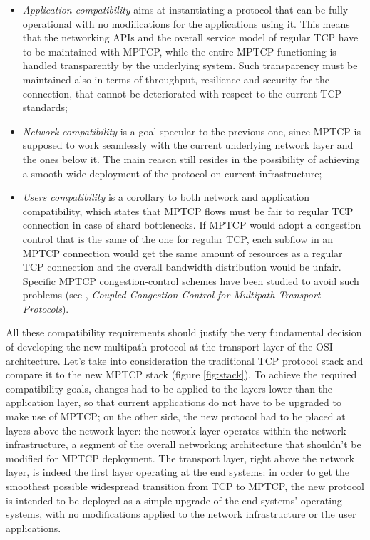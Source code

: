 \begin{itemize}
  \item \textit{Application compatibility} aims at instantiating a protocol that can be fully operational with no modifications for the applications using it. This means that the networking APIs and the overall service model of regular TCP have to be maintained with MPTCP, while the entire MPTCP functioning is handled transparently by the underlying system. Such transparency must be maintained also in terms of throughput, resilience and security for the connection, that cannot be deteriorated with respect to the current TCP standards;
  \item \textit{Network compatibility} is a goal specular to the previous one, since MPTCP is supposed to work seamlessly with the current underlying network layer and the ones below it. The main reason still resides in the possibility of achieving a smooth wide deployment of the protocol on current infrastructure;
  \item \textit{Users compatibility} is a corollary to both network and application compatibility, which states that MPTCP flows must be fair to regular TCP connection in case of shard bottlenecks. If MPTCP would adopt a congestion control that is the same of the one for regular TCP, each subflow in an MPTCP connection would get the same amount of resources as a regular TCP connection and the overall bandwidth distribution would be unfair. Specific MPTCP congestion-control schemes have been studied to avoid such problems (see , \textit{Coupled Congestion Control for Multipath Transport Protocols}).
\end{itemize}

All these compatibility requirements should justify the very fundamental decision of developing the new multipath protocol at the transport layer of the OSI architecture. Let's take into consideration the traditional TCP protocol stack and compare it to the new MPTCP stack (figure \ref{fig:stack}).
To achieve the required compatibility goals, changes had to be applied to the layers lower than the application layer, so that current applications do not have to be upgraded to make use of MPTCP; on the other side, the new protocol had to be placed at layers above the network layer: the network layer operates within the network infrastructure, a segment of the overall networking architecture that shouldn't be modified for MPTCP deployment. The transport layer, right above the network layer, is indeed the first layer operating at the end systems: in order to get the smoothest possible widespread transition from TCP to MPTCP, the new protocol is intended to be deployed as a simple upgrade of the end systems' operating systems, with no modifications applied to the network infrastructure or the user applications.

